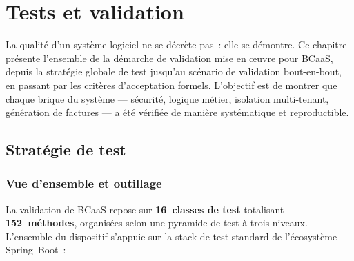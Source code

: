 
\chapter{Tests et validation}
\label{chap:tests-validation}

La qualité d'un système logiciel ne se décrète pas~: elle se démontre. Ce chapitre
présente l'ensemble de la démarche de validation mise en œuvre pour BCaaS, depuis la
stratégie globale de test jusqu'au scénario de validation bout-en-bout, en passant par
les critères d'acceptation formels. L'objectif est de montrer que chaque brique du système
--- sécurité, logique métier, isolation multi-tenant, génération de factures --- a été
vérifiée de manière systématique et reproductible.

\section{Stratégie de test}
\label{sec:strategie-test}

\subsection{Vue d'ensemble et outillage}
\label{subsec:outillage}

La validation de BCaaS repose sur \textbf{16~classes de test} totalisant
\textbf{152~méthodes}, organisées selon une pyramide de test à trois niveaux. L'ensemble
du dispositif s'appuie sur la stack de test standard de l'écosystème Spring~Boot~:

